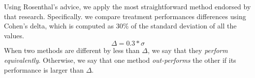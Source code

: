 \documentclass[10pt,compsoc,twocolumn]{IEEEtran}
\begin{document}
Using Rosenthal's advice, we apply the most straightforward method endorsed by that research.   Specifically. we compare  treatment performances differences using Cohen's delta, which is computed as 30\% of the standard deviation of all the values.
\begin{equation}\label{se:cohen}
\Delta = 0.3*\sigma
\end{equation}
When two methods are different by less than $\Delta$, we say that they {\em  perform equivalently}. 
Otherwise,  we say that one method {\em out-performs} the other if its performance is larger than
$\Delta$.

 
 





\end{document}
